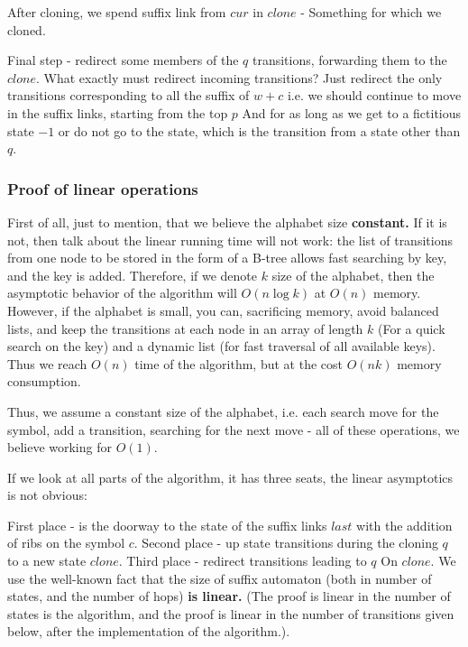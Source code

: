 After cloning, we spend suffix link from $cur$ in $clone$ - Something for which we cloned.

Final step - redirect some members of the $q$ transitions, forwarding them to the $clone$. What exactly must redirect incoming transitions? Just redirect the only transitions corresponding to all the suffix of $w + c$ i.e. we should continue to move in the suffix links, starting from the top $p$ And for as long as we get to a fictitious state $-1$ or do not go to the state, which is the transition from a state other than $q$.

\subsubsection{ Proof of linear operations }

First of all, just to mention, that we believe the alphabet size \textbf{constant.} If it is not, then talk about the linear running time will not work: the list of transitions from one node to be stored in the form of a B-tree allows fast searching by key, and the key is added. Therefore, if we denote $k$ size of the alphabet, then the asymptotic behavior of the algorithm will $O (n \log k)$ at $O (n)$ memory. However, if the alphabet is small, you can, sacrificing memory, avoid balanced lists, and keep the transitions at each node in an array of length $k$ (For a quick search on the key) and a dynamic list (for fast traversal of all available keys). Thus we reach $O (n)$ time of the algorithm, but at the cost $O (n k)$ memory consumption.

Thus, we assume a constant size of the alphabet, i.e. each search move for the symbol, add a transition, searching for the next move - all of these operations, we believe working for $O (1)$.

If we look at all parts of the algorithm, it has three seats, the linear asymptotics is not obvious:

First place - is the doorway to the state of the suffix links $last$ with the addition of ribs on the symbol $c$.
Second place - up state transitions during the cloning $q$ to a new state $clone$.
Third place - redirect transitions leading to $q$ On $clone$.
We use the well-known fact that the size of suffix automaton (both in number of states, and the number of hops) \textbf{is linear.} (The proof is linear in the number of states is the algorithm, and the proof is linear in the number of transitions given below, after the implementation of the algorithm.).

